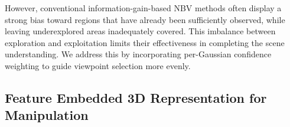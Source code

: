 However, conventional information-gain-based \ac{NBV} methods often display a strong bias toward regions that have already been sufficiently observed, while leaving underexplored areas inadequately covered. This imbalance between exploration and exploitation limits their effectiveness in completing the scene understanding. We address this by incorporating per-Gaussian confidence weighting to guide viewpoint selection more evenly.



\subsection{Feature Embedded 3D Representation for Manipulation}



